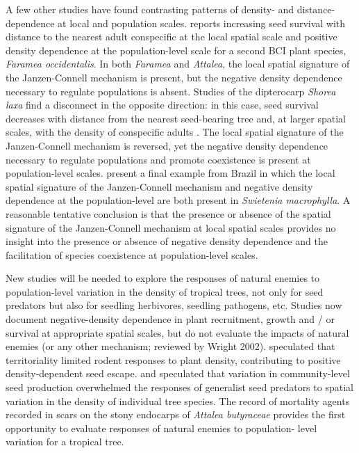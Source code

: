 \documentclass[b5paper,justified]{tufte-book} %
\begin{document}
\begin{fullwidth}
A few other studies have found contrasting patterns of density- and distance-dependence at local and population scales. \citet{Schupp1992} reports increasing seed survival with distance to the nearest adult conspecific at the local spatial scale and positive density dependence at the population-level scale for a second BCI plant species, \textit{Faramea occidentalis}. In both \textit{Faramea} and \textit{Attalea}, the local spatial signature of the Janzen-Connell mechanism is present, but the negative density dependence necessary to regulate populations is absent. Studies of the dipterocarp \textit{Shorea laxa} find a disconnect in the opposite direction: in this case, seed survival decreases with distance from the nearest seed-bearing tree \citep{Takeuchi2007} and, at larger spatial
scales, with the density of conspecific adults \citep{Takeuchi2010}. The local spatial signature of the Janzen-Connell mechanism is reversed, yet the negative density dependence necessary to regulate populations and promote coexistence is present at population-level scales. \citet{Norghauer2008} present a final example from Brazil in
which the local spatial signature of the Janzen-Connell mechanism and negative density dependence at the population-level are both present in \textit{Swietenia macrophylla}. A reasonable tentative conclusion is that the presence or absence of the spatial signature of the Janzen-Connell mechanism at local spatial scales provides no insight into the
presence or absence of negative density dependence and the facilitation of species coexistence at population-level scales.

New studies will be needed to explore the responses of natural enemies to population-level variation in the density of tropical trees, not only for seed predators but also for seedling herbivores, seedling pathogens, etc. Studies now document negative-density dependence in plant recruitment, growth and / or survival at appropriate spatial scales, but do not evaluate the impacts of natural enemies (or any other mechanism; reviewed by Wright 2002). \citet{Schupp1992} speculated that territoriality limited rodent responses to plant density, contributing to positive density-dependent seed escape. \citet{Takeuchi2010} and \citet{Chauvet2004} speculated that variation in
community-level seed production overwhelmed the responses of generalist seed predators to spatial variation in the density of individual tree species. The record of mortality agents recorded in scars on the stony endocarps of \textit{Attalea butyraceae} provides the first opportunity to evaluate responses of natural enemies to population-
level variation for a tropical tree. 



\end{fullwidth}
\end{document}
